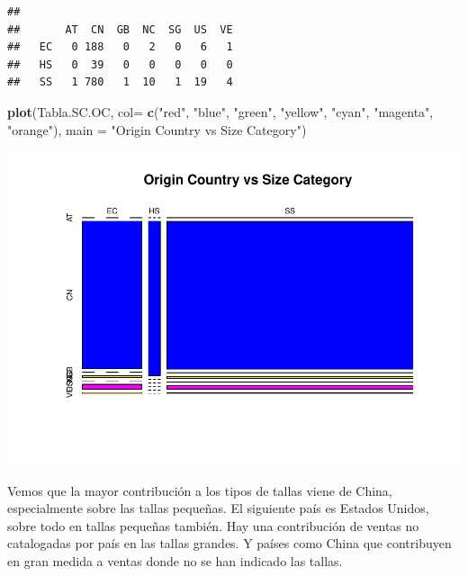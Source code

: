 \documentclass[
]{article}
\newenvironment{Shaded}{\begin{snugshade}}{\end{snugshade}}
\newcommand{\DataTypeTok}[1]{\textcolor[rgb]{0.13,0.29,0.53}{#1}}
\newcommand{\KeywordTok}[1]{\textcolor[rgb]{0.13,0.29,0.53}{\textbf{#1}}}
\newcommand{\NormalTok}[1]{#1}
\newcommand{\OperatorTok}[1]{\textcolor[rgb]{0.81,0.36,0.00}{\textbf{#1}}}
\newcommand{\StringTok}[1]{\textcolor[rgb]{0.31,0.60,0.02}{#1}}
\begin{document}
\begin{Shaded}
\end{Shaded}

\begin{verbatim}
##     
##       AT  CN  GB  NC  SG  US  VE
##   EC   0 188   0   2   0   6   1
##   HS   0  39   0   0   0   0   0
##   SS   1 780   1  10   1  19   4
\end{verbatim}

\begin{Shaded}
\begin{Highlighting}[]
\KeywordTok{plot}\NormalTok{(Tabla.SC.OC, }\DataTypeTok{col=} \KeywordTok{c}\NormalTok{(}\StringTok{"red"}\NormalTok{, }\StringTok{"blue"}\NormalTok{, }\StringTok{"green"}\NormalTok{, }\StringTok{"yellow"}\NormalTok{, }\StringTok{"cyan"}\NormalTok{, }\StringTok{"magenta"}\NormalTok{, }\StringTok{"orange"}\NormalTok{),}
     \DataTypeTok{main =} \StringTok{"Origin Country vs Size Category"}\NormalTok{)}
\end{Highlighting}
\end{Shaded}

\includegraphics{PRAC2_Limpieza_Analisis_Datos---Sales_files/figure-latex/unnamed-chunk-52-1.pdf}

Vemos que la mayor contribución a los tipos de tallas viene de China,
especialmente sobre las tallas pequeñas. El siguiente país es Estados
Unidos, sobre todo en tallas pequeñas también. Hay una contribución de
ventas no catalogadas por país en las tallas grandes. Y países como
China que contribuyen en gran medida a ventas donde no se han indicado
las tallas.
\end{document}
